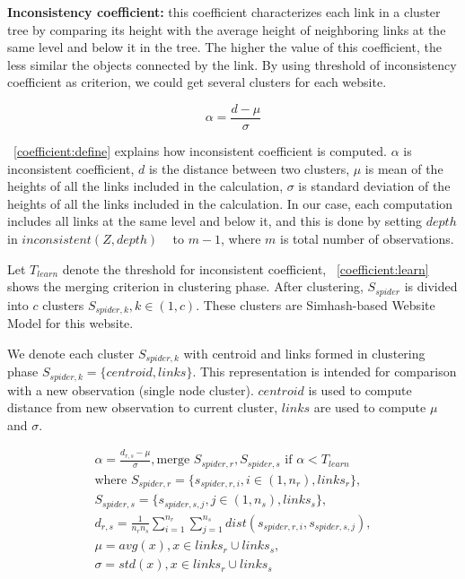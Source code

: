 {\bf Inconsistency coefficient:} this coefficient characterizes each link in a cluster tree by
comparing its height with the average height of neighboring links at the same
level and below it in the tree. The higher the value of this
coefficient, the less similar the
objects connected by the link. By using threshold of inconsistency
coefficient as criterion, we could get several clusters for each website.

\begin{equation}
  \label{coefficient:define}
  \alpha  = \frac{d - \mu}{\sigma}
\end{equation}

~\autoref{coefficient:define} explains how inconsistent coefficient is computed.
$\alpha$ is inconsistent coefficient, $d$ is the distance between two
clusters, $\mu$ is mean of the heights of all the links included in the
calculation, $\sigma$ is standard deviation of the heights of all the links
included in the calculation. In our case, each computation includes all links at
the same level and below it, and this is done by setting $depth$ in
$inconsistent(Z, depth)$ ~\cite{icintro} to $m-1$, where $m$ is total number of observations.


Let $T_{learn}$ denote the threshold for inconsistent coefficient, 
~\autoref{coefficient:learn} shows the merging criterion in clustering phase.
After clustering, $S_{spider}$ is divided into $c$ clusters $S_{spider, k}, k \in (1, c)$.
These clusters are Simhash-based Website Model for this website.

We denote each cluster $S_{spider, k}$ with centroid and links formed in
clustering phase $S_{spider, k} = \{centroid, links\}$. This representation is
intended for comparison with a new observation (single node cluster). $centroid$ is used to
compute distance from new observation to current cluster, $links$ are used
to compute $\mu$ and $\sigma$.

\begin{equation}
  \label{coefficient:learn}
  \begin{gathered}
    \alpha = \frac{d_{r,s} - \mu}{\sigma}, \text{merge } S_{spider, r},
    S_{spider, s} \text{ if } \alpha < T_{learn} \\
    \text{where }
    S_{spider, r} = \{s_{spider, r, i}, i \in (1, n_r), links_r\}, \\
    S_{spider, s} = \{s_{spider, s, j}, j \in (1, n_s), links_s\}, \\
    d_{r, s} = \frac{1}{n_rn_s}\sum_{i=1}^{n_r}\sum_{j=1}^{n_s} dist(s_{spider,
    r, i}, s_{spider, s, j}), \\ 
    \mu = avg(x), x \in  links_r \cup links_s, \\
    \sigma = std(x), x \in links_r \cup links_s \\
  \end{gathered}
\end{equation}

